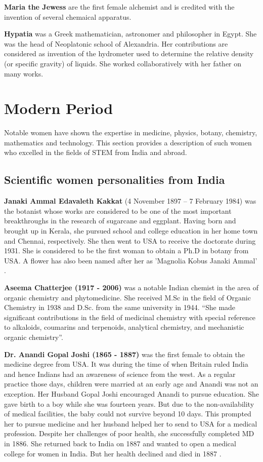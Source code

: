 \documentclass[a4paper,10pt]{article}
\begin{document}
\newblock
\textbf{Maria the Jewess} are the first female alchemist and is credited with the invention of several chemaical apparatus.

\newblock
\textbf{Hypatia} was a Greek mathematician, astronomer and philosopher in Egypt. She was the head of Neoplatonic school of Alexandria. Her contributions are considered as invention of the hydrometer used to determine the relative density (or specific gravity) of liquids. She worked collaboratively with her father on many works.\\

\section{Modern Period}
\label{sec:modern}
Notable women have shown the expertise in medicine, physics, botany, chemistry, mathematics and technology. This section provides a description of such women who excelled in the fields of STEM from India and abroad. 
\subsection{Scientific women personalities from India}
\newblock
\textbf{Janaki Ammal Edavaleth Kakkat} (4 November 1897 – 7 February 1984) was the botanist whose works are considered to be one of the most important breakthroughs in the research of sugarcane and eggplant. Having born and brought up in Kerala, she pursued school and college education in her home town and Chennai, respectively. She then went to USA to receive the doctorate during 1931. She is considered to be the first woman to obtain a Ph.D in botany from USA. A flower has also been named after her as 'Magnolia Kobus Janaki Ammal' \cite{janaki}.

\newblock
\textbf{Aseema Chatterjee (1917 - 2006)} was a notable Indian chemist in the area of organic chemistry and phytomedicine. She received M.Sc in the field of Organic Chemistry in 1938 and D.Sc. from the same university in 1944. ``She made significant contributions in the field of medicinal chemistry with special reference to alkaloids, coumarins and terpenoids, analytical chemistry, and mechanistic organic chemistry''.  \cite{chaterjee}


\newblock
\textbf{Dr. Anandi Gopal Joshi (1865 - 1887)} was the first female to obtain the medicine degree from USA. It was during the time of when Britain ruled India and hence Indians had an awareness of science from the west. As a regular practice those days, children were married at an early age and Anandi was not an exception. Her Husband Gopal Joshi encouraged Anandi to pursue education. She gave birth to a boy while she was fourteen years. But due to the non-availability of medical facilities, the baby could not survive beyond 10 days. This prompted her to pursue medicine and her husband helped her to send to USA for a medical profession. Despite her challenges of poor health, she successfully completed MD in 1886. She returned back to India on 1887 and wanted to open a medical college for women in India. But her health declined and died in 1887  \cite{joshi}.
\end{document}
